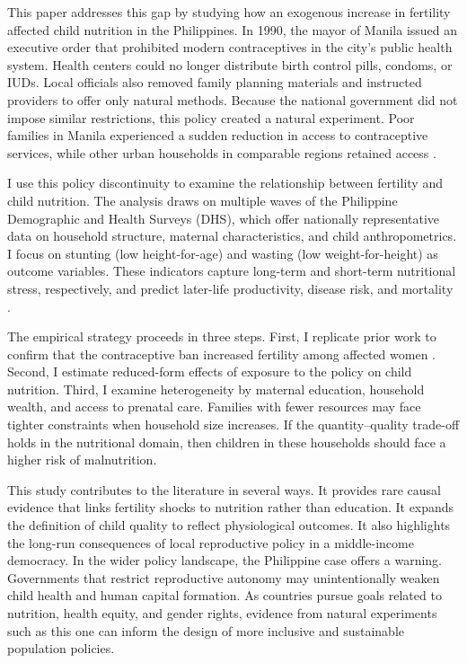\documentclass[2025 Schupf Fellowship Project]{AEA}
\begin{document}
This paper addresses this gap by studying how an exogenous increase in
fertility affected child nutrition in the Philippines. In 1990, the
mayor of Manila issued an executive order that prohibited modern
contraceptives in the city's public health system. Health centers could
no longer distribute birth control pills, condoms, or IUDs. Local
officials also removed family planning materials and instructed
providers to offer only natural methods. Because the national government
did not impose similar restrictions, this policy created a natural
experiment. Poor families in Manila experienced a sudden reduction in
access to contraceptive services, while other urban households in
comparable regions retained access \citep{dumas2019fertility}.

I use this policy discontinuity to examine the relationship between
fertility and child nutrition. The analysis draws on multiple waves of
the Philippine Demographic and Health Surveys (DHS), which offer
nationally representative data on household structure, maternal
characteristics, and child anthropometrics. I focus on stunting (low
height-for-age) and wasting (low weight-for-height) as outcome
variables. These indicators capture long-term and short-term nutritional
stress, respectively, and predict later-life productivity, disease risk,
and mortality \citep{victora2008maternal}.

The empirical strategy proceeds in three steps. First, I replicate prior
work to confirm that the contraceptive ban increased fertility among
affected women \citep{dumas2019fertility}. Second, I estimate
reduced-form effects of exposure to the policy on child nutrition.
Third, I examine heterogeneity by maternal education, household wealth,
and access to prenatal care. Families with fewer resources may face
tighter constraints when household size increases. If the
quantity--quality trade-off holds in the nutritional domain, then
children in these households should face a higher risk of malnutrition.

This study contributes to the literature in several ways. It provides
rare causal evidence that links fertility shocks to nutrition rather
than education. It expands the definition of child quality to reflect
physiological outcomes. It also highlights the long-run consequences of
local reproductive policy in a middle-income democracy. In the wider
policy landscape, the Philippine case offers a warning. Governments that
restrict reproductive autonomy may unintentionally weaken child health
and human capital formation. As countries pursue goals related to
nutrition, health equity, and gender rights, evidence from natural
experiments such as this one can inform the design of more inclusive and
sustainable population policies.
\end{document}
